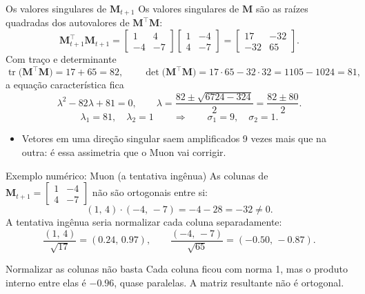 \documentclass[aspectratio=169,xcolor=dvipsnames]{beamer}
\begin{document}
  \begin{frame}{Os valores singulares de $\mathbf{M}_{t+1}$}
    Os valores singulares de $\mathbf{M}$ são as raízes quadradas dos autovalores de $\mathbf{M}^{\top}\mathbf{M}$:
    \[
      \mathbf{M}_{t+1}^{\top}\mathbf{M}_{t+1}
      =\begin{bmatrix}1&4\\-4&-7\end{bmatrix}\begin{bmatrix}1&-4\\4&-7\end{bmatrix}
      =\begin{bmatrix}17&-32\\-32&65\end{bmatrix}.
    \]
    Com traço e determinante
    \[
      \operatorname{tr}\!\big(\mathbf{M}^{\top}\mathbf{M}\big)=17+65=82,
      \qquad
      \det\!\big(\mathbf{M}^{\top}\mathbf{M}\big)=17\cdot 65-32\cdot 32=1105-1024=81,
    \]
    a equação característica fica
    \[
      \lambda^{2}-82\lambda+81=0,
      \qquad
      \lambda=\frac{82\pm\sqrt{6724-324}}{2}=\frac{82\pm 80}{2}.
    \]
    \[
      \lambda_1=81,\quad \lambda_2=1
      \qquad\Longrightarrow\qquad
      \sigma_1=9,\quad \sigma_2=1.
    \]
    \begin{itemize}
      \item Vetores em uma direção singular saem amplificados 9 vezes mais que na outra: é essa assimetria que o Muon vai corrigir.
    \end{itemize}
  \end{frame}

  \begin{frame}{Exemplo numérico: Muon (a tentativa ingênua)}
    As colunas de $\mathbf{M}_{t+1}=\begin{bmatrix}1&-4\\4&-7\end{bmatrix}$ não são ortogonais entre si:
    \[
      (1,\,4)\cdot(-4,\,-7) = -4-28 = -32 \neq 0.
    \]
    A tentativa ingênua seria normalizar cada coluna separadamente:
    \[
      \frac{(1,\,4)}{\sqrt{17}}=(0.24,\,0.97),
      \qquad
      \frac{(-4,\,-7)}{\sqrt{65}}=(-0.50,\,-0.87).
    \]
    \begin{alertblock}{Normalizar as colunas não basta}
      Cada coluna ficou com norma 1, mas o produto interno entre elas é $-0.96$, quase paralelas. A matriz resultante não é ortogonal.
    \end{alertblock}
  \end{frame}
\end{document}
